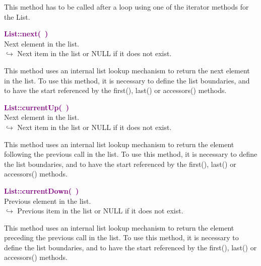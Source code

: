 This method has to be called after a loop using one of the iterator methods for the List.

\textcolor{purple}{\textbf{List::next(~)}}\label{List::next()}\\
Next element in the list.\\ \hspace*{10mm}$\hookrightarrow$ Next item in the list or NULL if it does not exist.

This method uses an internal list lookup mechanism to return the next element in the list.
To use this method, it is necessary to define the list boundaries, and to have the start referenced by the first(), last() or accessors() methods.

\textcolor{purple}{\textbf{List::currentUp(~)}}\label{List::currentUp()}\\
Next element in the list.\\ \hspace*{10mm}$\hookrightarrow$ Next item in the list or NULL if it does not exist.

This method uses an internal list lookup mechanism to return the element following the previous call in the list.
To use this method, it is necessary to define the list boundaries, and to have the start referenced by the first(), last() or accessors() methods.

\textcolor{purple}{\textbf{List::currentDown(~)}}\label{List::currentDown()}\\
Previous element in the list.\\ \hspace*{10mm}$\hookrightarrow$ Previous item in the list or NULL if it does not exist.

This method uses an internal list lookup mechanism to return the element preceding the previous call in the list.
To use this method, it is necessary to define the list boundaries, and to have the start referenced by the first(), last() or accessors() methods.

